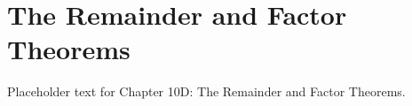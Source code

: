 \section{The Remainder and Factor Theorems}
Placeholder text for Chapter 10D: The Remainder and Factor Theorems.
